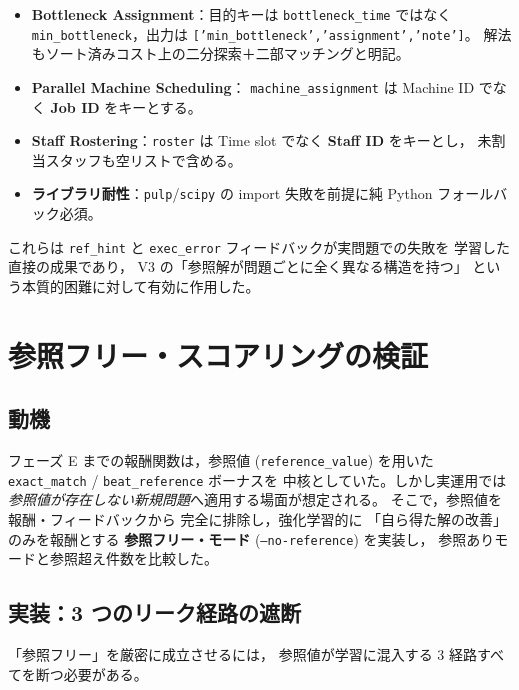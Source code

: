 \documentclass[uplatex,dvipdfmx,a4paper,11pt]{jsarticle}
\begin{document}
\begin{itemize}
  \item \textbf{Bottleneck Assignment}：目的キーは
    \texttt{bottleneck\_time} ではなく
    \texttt{min\_bottleneck}，出力は
    \texttt{['min\_bottleneck','assignment','note']}。
    解法もソート済みコスト上の二分探索＋二部マッチングと明記。
  \item \textbf{Parallel Machine Scheduling}：
    \texttt{machine\_assignment} は
    Machine ID でなく \textbf{Job ID} をキーとする。
  \item \textbf{Staff Rostering}：\texttt{roster} は
    Time slot でなく \textbf{Staff ID} をキーとし，
    未割当スタッフも空リストで含める。
  \item \textbf{ライブラリ耐性}：\texttt{pulp}/\texttt{scipy} の
    import 失敗を前提に純 Python フォールバック必須。
\end{itemize}

これらは \texttt{ref\_hint} と \texttt{exec\_error}
フィードバックが実問題での失敗を
学習した直接の成果であり，
V3 の「参照解が問題ごとに全く異なる構造を持つ」
という本質的困難に対して有効に作用した。

\section{参照フリー・スコアリングの検証}\label{sec:noref}

\subsection{動機}

フェーズ E までの報酬関数は，参照値
(\texttt{reference\_value}) を用いた
\texttt{exact\_match} / \texttt{beat\_reference} ボーナスを
中核としていた。しかし実運用では
\emph{参照値が存在しない新規問題}へ適用する場面が想定される。
そこで，参照値を報酬・フィードバックから
完全に排除し，強化学習的に
「自ら得た解の改善」のみを報酬とする
\textbf{参照フリー・モード} (\texttt{--no-reference}) を実装し，
参照ありモードと参照超え件数を比較した。

\subsection{実装：3 つのリーク経路の遮断}

「参照フリー」を厳密に成立させるには，
参照値が学習に混入する 3 経路すべてを断つ必要がある。
\end{document}

